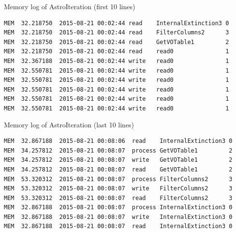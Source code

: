 \documentclass[10pt,twoside,openright,logo]{report}
\begin{document}
\begin{listing}
\caption{Memory log of AstroIteration (first 10 lines)}
\label{code:astroi-mh}
\begin{verbatim}
MEM  32.218750  2015-08-21 00:02:44 read    InternalExtinction3 0
MEM  32.218750  2015-08-21 00:02:44 read    FilterColumns2      3
MEM  32.218750  2015-08-21 00:02:44 read    GetVOTable1         2
MEM  32.218750  2015-08-21 00:02:44 read    read0               1
MEM  32.367188  2015-08-21 00:02:44 write   read0               1
MEM  32.550781  2015-08-21 00:02:44 write   read0               1
MEM  32.550781  2015-08-21 00:02:44 write   read0               1
MEM  32.550781  2015-08-21 00:02:44 write   read0               1
MEM  32.550781  2015-08-21 00:02:44 write   read0               1
MEM  32.550781  2015-08-21 00:02:44 write   read0               1
\end{verbatim}
\end{listing}

\begin{listing}
\caption{Memory log of AstroIteration (last 10 lines)}
\label{code:astroi-mt}
\begin{verbatim}
MEM  32.867188  2015-08-21 00:08:06  read    InternalExtinction3 0
MEM  34.257812  2015-08-21 00:08:07  process GetVOTable1         2
MEM  34.257812  2015-08-21 00:08:07  write   GetVOTable1         2
MEM  34.257812  2015-08-21 00:08:07  read    GetVOTable1         2
MEM  53.320312  2015-08-21 00:08:07  process FilterColumns2      3
MEM  53.320312  2015-08-21 00:08:07  write   FilterColumns2      3
MEM  53.320312  2015-08-21 00:08:07  read    FilterColumns2      3
MEM  32.867188  2015-08-21 00:08:07  process InternalExtinction3 0
MEM  32.867188  2015-08-21 00:08:07  write   InternalExtinction3 0
MEM  32.867188  2015-08-21 00:08:07  read    InternalExtinction3 0
\end{verbatim}
\end{listing}

\end{document}

